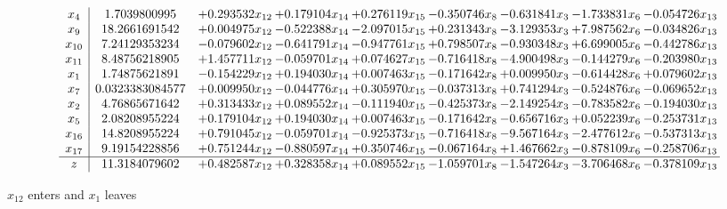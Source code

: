 \documentclass[10pt]{article}
\begin{document}
 \[\begin{array}{c| c c@{\hskip 2pt} c@{\hskip 2pt} c@{\hskip 2pt} c@{\hskip 2pt} c@{\hskip 2pt} c@{\hskip 2pt} c@{\hskip 2pt} }
 x_{4}   &  1.7039800995 & + 0.293532 x_{12} & + 0.179104 x_{14} & + 0.276119 x_{15} & -0.350746 x_{8} & -0.631841 x_{3} & -1.733831 x_{6} & -0.054726 x_{13}\\
 x_{9}   &  18.2661691542 & + 0.004975 x_{12} & -0.522388 x_{14} & -2.097015 x_{15} & + 0.231343 x_{8} & -3.129353 x_{3} & + 7.987562 x_{6} & -0.034826 x_{13}\\
 x_{10}   &  7.24129353234 & -0.079602 x_{12} & -0.641791 x_{14} & -0.947761 x_{15} & + 0.798507 x_{8} & -0.930348 x_{3} & + 6.699005 x_{6} & -0.442786 x_{13}\\
 x_{11}   &  8.48756218905 & + 1.457711 x_{12} & -0.059701 x_{14} & + 0.074627 x_{15} & -0.716418 x_{8} & -4.900498 x_{3} & -0.144279 x_{6} & -0.203980 x_{13}\\
 x_{1}   &  1.74875621891 & -0.154229 x_{12} & + 0.194030 x_{14} & + 0.007463 x_{15} & -0.171642 x_{8} & + 0.009950 x_{3} & -0.614428 x_{6} & + 0.079602 x_{13}\\
 x_{7}   &  0.0323383084577 & + 0.009950 x_{12} & -0.044776 x_{14} & + 0.305970 x_{15} & -0.037313 x_{8} & + 0.741294 x_{3} & -0.524876 x_{6} & -0.069652 x_{13}\\
 x_{2}   &  4.76865671642 & + 0.313433 x_{12} & + 0.089552 x_{14} & -0.111940 x_{15} & -0.425373 x_{8} & -2.149254 x_{3} & -0.783582 x_{6} & -0.194030 x_{13}\\
 x_{5}   &  2.08208955224 & + 0.179104 x_{12} & + 0.194030 x_{14} & + 0.007463 x_{15} & -0.171642 x_{8} & -0.656716 x_{3} & + 0.052239 x_{6} & -0.253731 x_{13}\\
 x_{16}   &  14.8208955224 & + 0.791045 x_{12} & -0.059701 x_{14} & -0.925373 x_{15} & -0.716418 x_{8} & -9.567164 x_{3} & -2.477612 x_{6} & -0.537313 x_{13}\\
 x_{17}   &  9.19154228856 & + 0.751244 x_{12} & -0.880597 x_{14} & + 0.350746 x_{15} & -0.067164 x_{8} & + 1.467662 x_{3} & -0.878109 x_{6} & -0.258706 x_{13}\\
\hline
z    &  11.3184079602 & + 0.482587 x_{12} & + 0.328358 x_{14} & + 0.089552 x_{15} & -1.059701 x_{8} & -1.547264 x_{3} & -3.706468 x_{6} & -0.378109 x_{13}\\
\end{array}\]


 $ x_{12} $ enters and $ x_{1} $ leaves 
\end{document}
